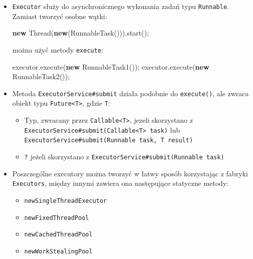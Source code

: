 \documentclass[11pt]{article}
\providecommand{\tightlist}{%
      \setlength{\itemsep}{0pt}\setlength{\parskip}{0pt}}
\newenvironment{Shaded}{}{}
\newcommand{\KeywordTok}[1]{\textcolor[rgb]{0.00,0.44,0.13}{\textbf{{#1}}}}
\newcommand{\FunctionTok}[1]{\textcolor[rgb]{0.02,0.16,0.49}{{#1}}}
\newcommand{\NormalTok}[1]{{#1}}
\newcommand{\OperatorTok}[1]{\textcolor[rgb]{0.40,0.40,0.40}{{#1}}}
\newcommand{\BuiltInTok}[1]{{#1}}
\begin{document}
\begin{itemize}
\item
  \texttt{Executor} służy do asynchronicznego wykonania zadań typu
  \texttt{Runnable}. Zamiast tworzyć osobne wątki:

\begin{Shaded}
\begin{Highlighting}[]
\KeywordTok{new} \BuiltInTok{Thread}\OperatorTok{(}\KeywordTok{new}\OperatorTok{(}\FunctionTok{RunnableTask}\OperatorTok{())).}\FunctionTok{start}\OperatorTok{();}
\end{Highlighting}
\end{Shaded}

  można użyć metody \texttt{execute}:

\begin{Shaded}
\begin{Highlighting}[]
\NormalTok{executor}\OperatorTok{.}\FunctionTok{execute}\OperatorTok{(}\KeywordTok{new} \FunctionTok{RunnableTask1}\OperatorTok{());}
\NormalTok{executor}\OperatorTok{.}\FunctionTok{execute}\OperatorTok{(}\KeywordTok{new} \FunctionTok{RunnableTask2}\OperatorTok{());}
\end{Highlighting}
\end{Shaded}
\item
  Metoda \texttt{ExecutorService\#submit} działa podobnie do
  \texttt{execute()}, ale zwraca obiekt typu
  \texttt{Future\textless{}T\textgreater{}}, gdzie \texttt{T}:

  \begin{itemize}
  \tightlist
  \item
    Typ, zwracany przez \texttt{Callable\textless{}T\textgreater{}},
    jezeli skorzystano z\\
    \texttt{ExecutorService\#submit(Callable\textless{}T\textgreater{}\ task)}
    lub\\
    \texttt{ExecutorService\#submit(Runnable\ task,\ T\ result)}
  \item
    \texttt{?} jeżeli skorzystano z
    \texttt{ExecutorService\#submit(Runnable\ task)}
  \end{itemize}
\item
  Poszczególne executory można tworzyć w łatwy sposób korzystając z
  fabryki \texttt{Executors}, między innymi zawiera ona następujące
  statyczne metody:

  \begin{itemize}
  \tightlist
  \item
    \texttt{newSingleThreadExecutor}
  \item
    \texttt{newFixedThreadPool}
  \item
    \texttt{newCachedThreadPool}
  \item
    \texttt{newWorkStealingPool}
  \end{itemize}
\end{itemize}
\end{document}
